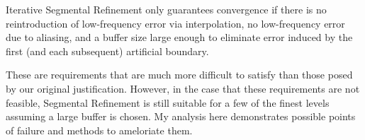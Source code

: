 \documentclass[final]{siamart1116}
\numberwithin{theorem}{section}
\begin{document}
Iterative Segmental Refinement only guarantees convergence if there is no reintroduction of low-frequency error via interpolation, no low-frequency error due to aliasing, and a buffer size large enough to eliminate error induced by the first (and each subsequent) artificial boundary.  

These are requirements that are much more difficult to satisfy than those posed by our original justification. However, in the case that these requirements are not feasible, Segmental Refinement is still suitable for a few of the finest levels assuming a large buffer is chosen. My analysis here demonstrates possible points of failure and methods to ameloriate them. 





\end{document}
